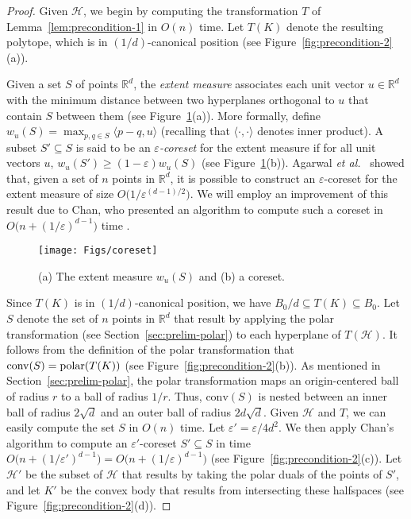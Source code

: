 \documentclass[11pt]{article}   \usepackage[letterpaper,hmargin=2.1cm,vmargin=3cm]{geometry}
\newcommand{\ang}[1]{\langle #1\rangle}
\newcommand{\RE}{\mathbb{R}}    \newcommand{\ZZ}{\mathbb{Z}}    \newcommand{\eps}{\varepsilon}  \newcommand{\ST}{\,:\,}         \newcommand{\sq}{\square}
\newcommand{\conv}{\mathrm{conv}}
\newcommand{\etal}{\textit{et al.}}
\begin{document}
\begin{proof}
Given $\mathcal{H}$, we begin by computing the transformation $T$ of Lemma~\ref{lem:precondition-1} in $O(n)$ time. Let $T(K)$ denote the resulting polytope, which is in $(1/d)$-canonical position (see Figure~\ref{fig:precondition-2}(a)).

Given a set $S$ of points $\RE^d$, the \emph{extent measure} associates each unit vector $u \in \RE^d$ with the minimum distance between two hyperplanes orthogonal to $u$ that contain $S$ between them (see Figure~\ref{fig:coreset}(a)). More formally, define $w_u(S) = \max_{p,q \in S} \ang{p-q,u}$ (recalling that $\ang{\cdot, \cdot}$ denotes inner product). A subset $S' \subseteq S$ is said to be an \emph{$\eps$-coreset} for the extent measure if for all unit vectors $u$, $w_u(S') \ge (1-\eps) w_u(S)$ (see Figure~\ref{fig:coreset}(b)). Agarwal {\etal}~\cite{AHV-coreset} showed that, given a set of $n$ points in $\RE^d$, it is possible to construct an $\eps$-coreset for the extent measure of size $O\big(1/\eps^{(d-1)/2}\big)$. We will employ an improvement of this result due to Chan, who presented an algorithm to compute such a coreset in $O\big(n + (1/\eps)^{d-1}\big)$ time \cite{Chan-coreset}.

\begin{figure}[htbp]
  \centerline{\texttt{[image: Figs/coreset]}}
  \caption{(a) The extent measure $w_u(S)$ and (b) a coreset.}
  \label{fig:coreset}
\end{figure}


Since $T(K)$ is in $(1/d)$-canonical position, we have $B_0/d \subseteq T(K) \subseteq B_0$. Let $S$ denote the set of $n$ points in $\RE^d$ that result by applying the polar transformation (see Section~\ref{sec:prelim-polar}) to each hyperplane of $T(\mathcal{H})$. It follows from the definition of the polar transformation that $\conv(S) = \polar{T(K)}$ (see Figure~\ref{fig:precondition-2}(b)). As mentioned in Section~\ref{sec:prelim-polar}, the polar transformation maps an origin-centered ball of radius $r$ to a ball of radius $1/r$. Thus, $\conv(S)$ is nested between an inner ball of radius $2 \sqrt{d}$ and an outer ball of radius $2 d \sqrt{d}$. Given $\mathcal{H}$ and $T$, we can easily compute the set $S$ in $O(n)$ time. Let $\eps' = \eps/4 d^2$. We then apply Chan's algorithm to compute an $\eps'$-coreset $S' \subseteq S$ in time $O\big(n + (1/\eps')^{d-1}\big) = O\big(n + (1/\eps)^{d-1}\big)$ (see Figure~\ref{fig:precondition-2}(c)). Let $\mathcal{H'}$ be the subset of $\mathcal{H}$ that results by taking the polar duals of the points of $S'$, and let $K'$ be the convex body that results from intersecting these halfspaces (see Figure~\ref{fig:precondition-2}(d)).


\end{proof}
\end{document}
